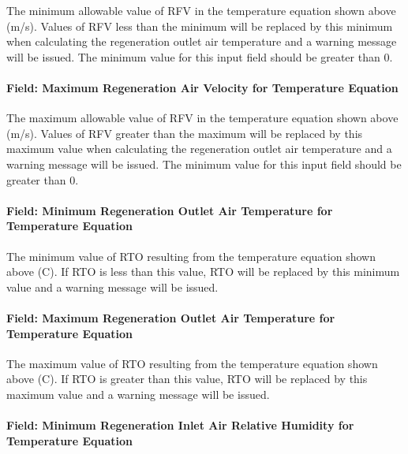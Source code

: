 The minimum allowable value of RFV in the temperature equation shown above (m/s). Values of RFV less than the minimum will be replaced by this minimum when calculating the regeneration outlet air temperature and a warning message will be issued. The minimum value for this input field should be greater than 0.

\paragraph{Field: Maximum Regeneration Air Velocity for Temperature Equation}\label{field-maximum-regeneration-air-velocity-for-temperature-equation}

The maximum allowable value of RFV in the temperature equation shown above (m/s). Values of RFV greater than the maximum will be replaced by this maximum value when calculating the regeneration outlet air temperature and a warning message will be issued. The minimum value for this input field should be greater than 0.

\paragraph{Field: Minimum Regeneration Outlet Air Temperature for Temperature Equation}\label{field-minimum-regeneration-outlet-air-temperature-for-temperature-equation}

The minimum value of RTO resulting from the temperature equation shown above (C). If RTO is less than this value, RTO will be replaced by this minimum value and a warning message will be issued.

\paragraph{Field: Maximum Regeneration Outlet Air Temperature for Temperature Equation}\label{field-maximum-regeneration-outlet-air-temperature-for-temperature-equation}

The maximum value of RTO resulting from the temperature equation shown above (C). If RTO is greater than this value, RTO will be replaced by this maximum value and a warning message will be issued.

\paragraph{Field: Minimum Regeneration Inlet Air Relative Humidity for Temperature Equation}\label{field-minimum-regeneration-inlet-air-relative-humidity-for-temperature-equation}

